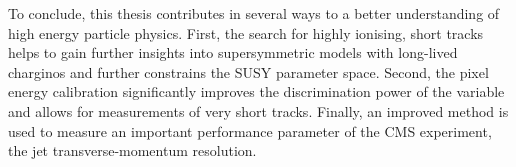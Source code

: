 To conclude, this thesis contributes in several ways to a better understanding of high energy particle physics.
First, the search for highly ionising, short tracks helps to gain further insights into supersymmetric models with long-lived charginos and further constrains the SUSY parameter space.
Second, the pixel energy calibration significantly improves the discrimination power of the variable \dedx and allows for \dedx measurements of very short tracks.
Finally, an improved method is used to  measure an important performance parameter of the CMS experiment, the jet transverse-momentum resolution.

